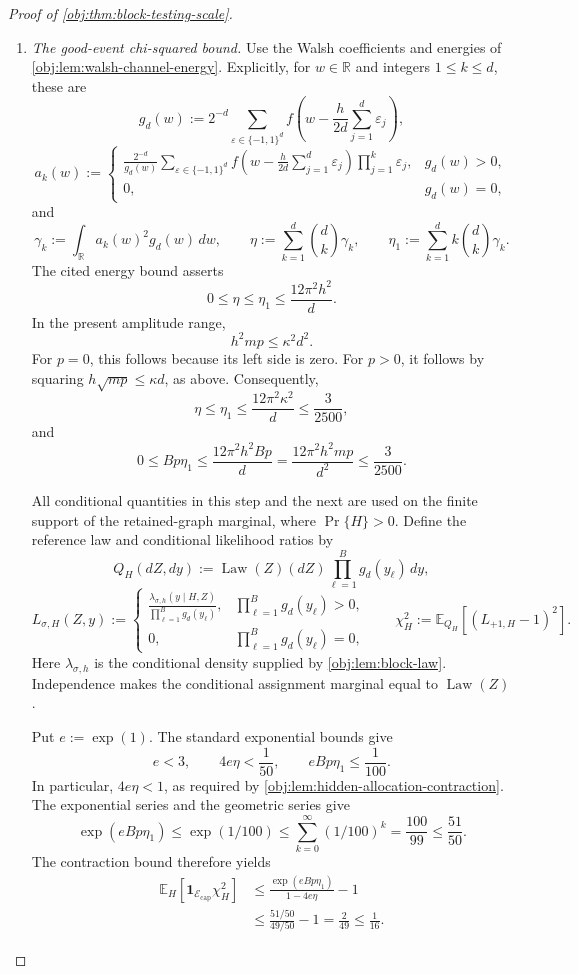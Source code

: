 \begin{proof}[Proof of \cref{obj:thm:block-testing-scale}]
\begin{enumerate}
\item \textit{The good-event chi-squared bound.}
Use the Walsh coefficients and energies of
\cref{obj:lem:walsh-channel-energy}. Explicitly, for \(w\in\mathbb R\) and integers \(1\le k\le d\), these are
\[
g_d(w):=
2^{-d}\sum_{\varepsilon\in\{-1,1\}^d}
f\!\left(w-\frac h{2d}\sum_{j=1}^{d}\varepsilon_j\right),
\]
\[
a_k(w):=
\begin{cases}
\displaystyle
\frac{2^{-d}}{g_d(w)}
\sum_{\varepsilon\in\{-1,1\}^d}
f\!\left(w-\frac h{2d}\sum_{j=1}^{d}\varepsilon_j\right)
\prod_{j=1}^{k}\varepsilon_j,
&g_d(w)>0,\\
0,&g_d(w)=0,
\end{cases}
\]
and
\[
\gamma_k:=\int_{\mathbb R}a_k(w)^2g_d(w)\,dw,
\qquad
\eta:=\sum_{k=1}^{d}\binom dk\gamma_k,
\qquad
\eta_1:=\sum_{k=1}^{d}k\binom dk\gamma_k.
\]
The cited energy bound asserts
\[
0\le\eta\le\eta_1\le\frac{12\pi^2h^2}{d}.
\]
In the present amplitude range,
\[
h^2mp\le\kappa^2d^2.
\]
For \(p=0\), this follows because its left side is zero. For \(p>0\), it follows by squaring
\(h\sqrt{mp}\le\kappa d\), as above. Consequently,
\[
\eta
\le\eta_1
\le\frac{12\pi^2\kappa^2}{d}
\le\frac3{2500},
\]
and
\[
0\le Bp\eta_1
\le
\frac{12\pi^2h^2Bp}{d}
=
\frac{12\pi^2h^2mp}{d^2}
\le\frac3{2500}.
\]

All conditional quantities in this step and the next are used on the finite support of the retained-graph marginal, where \(\Pr\{H\}>0\). Define the reference law and conditional likelihood ratios by
\[
Q_H(dZ,dy):=
\operatorname{Law}(Z)(dZ)\prod_{\ell=1}^{B}g_d(y_\ell)\,dy,
\]
\[
L_{\sigma,H}(Z,y):=
\begin{cases}
\displaystyle
\frac{\lambda_{\sigma,h}(y\mid H,Z)}
{\prod_{\ell=1}^{B}g_d(y_\ell)},
&\prod_{\ell=1}^{B}g_d(y_\ell)>0,\\
0,&\prod_{\ell=1}^{B}g_d(y_\ell)=0,
\end{cases}
\qquad
\chi_H^2:=\mathbb E_{Q_H}[(L_{+1,H}-1)^2].
\]
Here \(\lambda_{\sigma,h}\) is the conditional density supplied by
\cref{obj:lem:block-law}. Independence makes the conditional assignment marginal equal to \(\operatorname{Law}(Z)\).

Put \(e:=\exp(1)\). The standard exponential bounds give
\[
e<3,\qquad
4e\eta<\frac1{50},\qquad
eBp\eta_1\le\frac1{100}.
\]
In particular, \(4e\eta<1\), as required by
\cref{obj:lem:hidden-allocation-contraction}. The exponential series and the geometric series give
\[
\exp(eBp\eta_1)
\le\exp(1/100)
\le\sum_{k=0}^{\infty}(1/100)^k
=\frac{100}{99}
\le\frac{51}{50}.
\]
The contraction bound therefore yields
\[
\begin{aligned}
\mathbb E_H[\mathbf1_{\mathcal E_{\mathrm{cap}}}\chi_H^2]
&\le
\frac{\exp(eBp\eta_1)}{1-4e\eta}-1\\
&\le
\frac{51/50}{49/50}-1
=\frac2{49}
\le\frac1{16}.
\end{aligned}
\]


\end{enumerate}
\end{proof}
